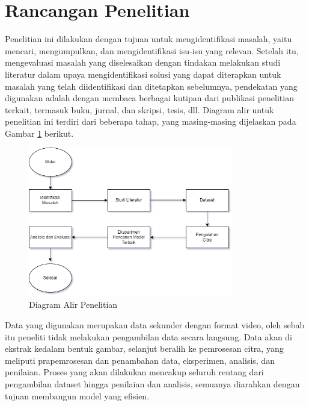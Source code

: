 \section{Rancangan Penelitian}

   Penelitian ini dilakukan dengan tujuan untuk mengidentifikasi  masalah, yaitu mencari, mengumpulkan, dan mengidentifikasi isu-isu yang relevan. Setelah itu, mengevaluasi masalah yang diselesaikan dengan tindakan melakukan studi literatur dalam upaya mengidentifikasi solusi yang dapat diterapkan untuk masalah yang telah diidentifikasi dan ditetapkan sebelumnya, pendekatan yang digunakan adalah dengan membaca berbagai kutipan dari publikasi penelitian terkait, termasuk buku, jurnal, dan skripsi, tesis, dll. Diagram alir untuk penelitian ini terdiri dari beberapa tahap, yang masing-masing dijelaskan pada Gambar \ref{Diagram Alir Penelitian} berikut. 



    \begin{figure}[H]
      \centering
      \includegraphics[width=0.8\textwidth]{figures/bab3/Diagram alir penelitian.png}
      \caption{Diagram Alir Penelitian}
      \label{Diagram Alir Penelitian}
      \medskip %
      \begin{minipage}{0.8\textwidth}
        \centering
      \end{minipage}
    \end{figure}



    Data yang digunakan merupakan data sekunder dengan format video, oleh sebab itu peneliti tidak melakukan pengambilan data secara langsung. Data akan di ekstrak kedalam bentuk gambar, selanjut beralih ke pemrosesan citra, yang meliputi prapemrosesan dan penambahan data, eksperimen, analisis, dan penilaian. Proses yang akan dilakukan mencakup seluruh rentang dari  pengambilan dataset hingga penilaian dan analisis, semuanya diarahkan dengan tujuan membangun model yang efisien. 
    
